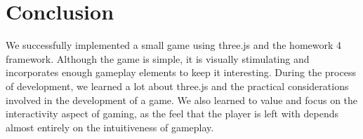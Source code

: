 \documentclass[a4paper]{article}
\begin{document}
\section{Conclusion}
We successfully implemented a small game using three.js and the homework 4 framework. Although the game is simple, it is visually stimulating and incorporates enough gameplay elements to keep it interesting. During the process of development, we learned a lot about three.js and the practical considerations involved in the development of a game. We also learned to value and focus on the interactivity aspect of gaming, as the feel that the player is left with depends almost entirely on the intuitiveness of gameplay.
\end{document}
